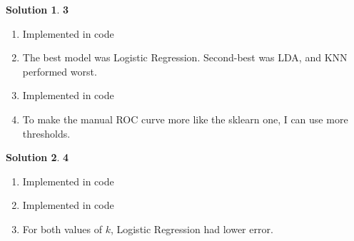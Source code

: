 \documentclass[11pt]{article}
\theoremstyle{definition}
\theoremstyle{nopunct}
\newtheorem*{s}{Solution}
\begin{document}
\vspace{10pt}

\begin{s}
  \textbf{3}

  \begin{enumerate}
    \item Implemented in code
    \item The best model was Logistic Regression. Second-best was LDA, and KNN
      performed worst.
    \item Implemented in code
    \item To make the manual ROC curve more like the sklearn one, I can use more
      thresholds.
  \end{enumerate}

\end{s}

\vspace{10pt}

\begin{s}
  \textbf{4}

  \begin{enumerate}
    \item Implemented in code
    \item Implemented in code
    \item For both values of $k$, Logistic Regression had lower error.
  \end{enumerate}

\end{s}
\end{document}
